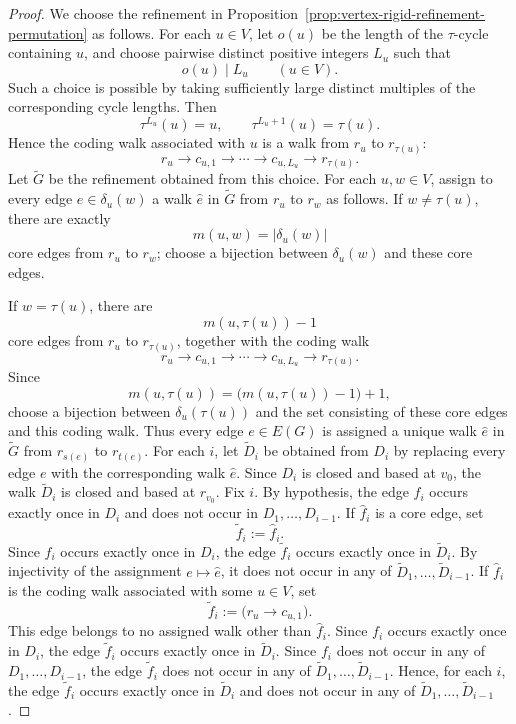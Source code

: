 \documentclass[a4paper,10pt]{amsart}
\theoremstyle{plain}
\theoremstyle{definition}
\begin{document}
\begin{proof}
We choose the refinement in
Proposition~\ref{prop:vertex-rigid-refinement-permutation}
as follows. For each $u\in V$, let $o(u)$ be the length of the
$\tau$-cycle containing $u$, and choose pairwise distinct positive
integers $L_u$ such that
\[
o(u)\mid L_u
\qquad (u\in V).
\]
Such a choice is possible by taking sufficiently large distinct
multiples of the corresponding cycle lengths. Then
\[
\tau^{L_u}(u)=u,
\qquad
\tau^{L_u+1}(u)=\tau(u).
\]
Hence the coding walk associated with $u$ is a walk from $r_u$ to
$r_{\tau(u)}$:
\[
r_u\longrightarrow c_{u,1}\longrightarrow\cdots
\longrightarrow c_{u,L_u}\longrightarrow r_{\tau(u)}.
\]
Let $\widetilde G$ be the refinement obtained from this choice. For each $u,w\in V$, assign to every edge $e\in\delta_u(w)$ a walk
$\widehat e$ in $\widetilde G$ from $r_u$ to $r_w$ as follows. If $w\neq\tau(u)$, there are exactly
\[
m(u,w)=|\delta_u(w)|
\]
core edges from $r_u$ to $r_w$; choose a bijection between
$\delta_u(w)$ and these core edges.

If $w=\tau(u)$, there are
\[
m(u,\tau(u))-1
\]
core edges from $r_u$ to $r_{\tau(u)}$, together with the coding walk
\[
r_u\longrightarrow c_{u,1}\longrightarrow\cdots
\longrightarrow c_{u,L_u}\longrightarrow r_{\tau(u)}.
\]
Since
\[
m(u,\tau(u))
=
\bigl(m(u,\tau(u))-1\bigr)+1,
\]
choose a bijection between $\delta_u(\tau(u))$ and the set consisting
of these core edges and this coding walk.
Thus every edge $e\in E(G)$ is assigned a unique walk $\widehat e$ in
$\widetilde G$ from $r_{s(e)}$ to $r_{t(e)}$. For each $i$, let
$\widetilde D_i$ be obtained from $D_i$ by replacing every edge $e$
with the corresponding walk $\widehat e$. Since $D_i$ is closed and
based at $v_0$, the walk $\widetilde D_i$ is closed and based at
$r_{v_0}$.
Fix $i$. By hypothesis, the edge $f_i$ occurs exactly once in $D_i$
and does not occur in $D_1,\dots,D_{i-1}$. If $\widehat f_i$ is a core edge, set
\[
\widetilde f_i:=\widehat f_i.
\]
Since $f_i$ occurs exactly once in $D_i$, the edge
$\widetilde f_i$ occurs exactly once in $\widetilde D_i$.
By injectivity of the assignment $e\mapsto\widehat e$, it does not
occur in any of $\widetilde D_1,\dots,\widetilde D_{i-1}$.
If $\widehat f_i$ is the coding walk associated with some $u\in V$, set
\[
\widetilde f_i:=
\bigl(r_u\longrightarrow c_{u,1}\bigr).
\]
This edge belongs to no assigned walk other than $\widehat f_i$.
Since $f_i$ occurs exactly once in $D_i$, the edge
$\widetilde f_i$ occurs exactly once in $\widetilde D_i$.
Since $f_i$ does not occur in any of $D_1,\dots,D_{i-1}$,
the edge $\widetilde f_i$ does not occur in any of
$\widetilde D_1,\dots,\widetilde D_{i-1}$. Hence, for each $i$, the edge $\widetilde f_i$ occurs exactly once in $\widetilde D_i$ and does not occur in any of $\widetilde D_1,\dots,\widetilde D_{i-1}$.
\end{proof}
\end{document}
